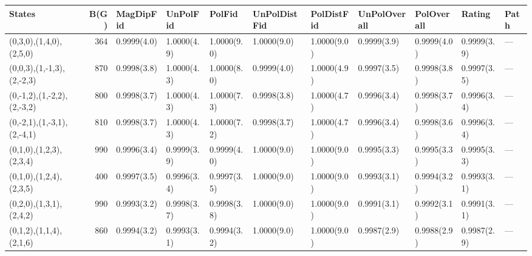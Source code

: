 \begin{tabular}{lrlllllllll}
\hline
 States                     &   B(G) & MagDipFid   & UnPolFid    & PolFid      & UnPolDistFid   & PolDistFid   & UnPolOverall   & PolOverall   & Rating      & Path   \\
\hline
 (0,3,0),(1,4,0),(2,5,0)    &    364 & 0.9999(4.0) & 1.0000(4.9) & 1.0000(9.0) & 1.0000(9.0)    & 1.0000(9.0)  & 0.9999(3.9)    & 0.9999(4.0)  & 0.9999(3.9) & ---    \\
 (0,0,3),(1,-1,3),(2,-2,3)  &    870 & 0.9998(3.8) & 1.0000(4.3) & 1.0000(8.0) & 0.9999(4.0)    & 1.0000(4.9)  & 0.9997(3.5)    & 0.9998(3.8)  & 0.9997(3.5) & ---    \\
 (0,-1,2),(1,-2,2),(2,-3,2) &    800 & 0.9998(3.7) & 1.0000(4.3) & 1.0000(7.3) & 0.9998(3.8)    & 1.0000(4.7)  & 0.9996(3.4)    & 0.9998(3.7)  & 0.9996(3.4) & ---    \\
 (0,-2,1),(1,-3,1),(2,-4,1) &    810 & 0.9998(3.7) & 1.0000(4.3) & 1.0000(7.2) & 0.9998(3.7)    & 1.0000(4.7)  & 0.9996(3.4)    & 0.9998(3.6)  & 0.9996(3.4) & ---    \\
 (0,1,0),(1,2,3),(2,3,4)    &    990 & 0.9996(3.4) & 0.9999(3.9) & 0.9999(4.0) & 1.0000(9.0)    & 1.0000(9.0)  & 0.9995(3.3)    & 0.9995(3.3)  & 0.9995(3.3) & ---    \\
 (0,1,0),(1,2,4),(2,3,5)    &    400 & 0.9997(3.5) & 0.9996(3.4) & 0.9997(3.5) & 1.0000(9.0)    & 1.0000(9.0)  & 0.9993(3.1)    & 0.9994(3.2)  & 0.9993(3.1) & ---    \\
 (0,2,0),(1,3,1),(2,4,2)    &    990 & 0.9993(3.2) & 0.9998(3.7) & 0.9998(3.8) & 1.0000(9.0)    & 1.0000(9.0)  & 0.9991(3.1)    & 0.9992(3.1)  & 0.9991(3.1) & ---    \\
 (0,1,2),(1,1,4),(2,1,6)    &    860 & 0.9994(3.2) & 0.9993(3.1) & 0.9994(3.2) & 1.0000(9.0)    & 1.0000(9.0)  & 0.9987(2.9)    & 0.9988(2.9)  & 0.9987(2.9) & ---    \\
\hline
\end{tabular}